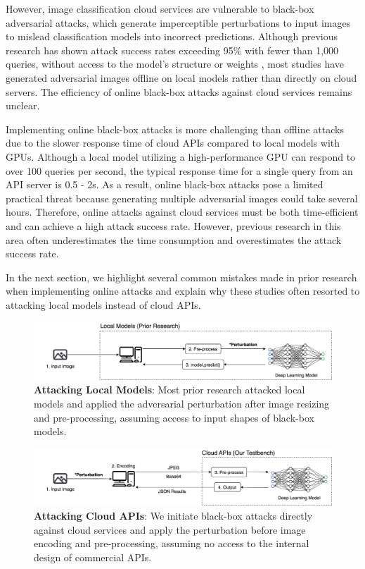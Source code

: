 However, image classification cloud services are vulnerable to black-box adversarial attacks, which generate imperceptible perturbations to input images to mislead classification models into incorrect predictions. Although previous research has shown attack success rates exceeding 95\% with fewer than 1,000 queries, without access to the model's structure or weights \citep{bhambri2019survey}, most studies have generated adversarial images offline on local models rather than directly on cloud servers. The efficiency of online black-box attacks against cloud services remains unclear.

Implementing online black-box attacks is more challenging than offline attacks due to the slower response time of cloud APIs compared to local models with GPUs. Although a local model utilizing a high-performance GPU can respond to over 100 queries per second, the typical response time for a single query from an API server is 0.5 - 2s. As a result, online black-box attacks pose a limited practical threat because generating multiple adversarial images could take several hours. Therefore, online attacks against cloud services must be both time-efficient and can achieve a high attack success rate. However, previous research in this area often underestimates the time consumption and overestimates the attack success rate.

In the next section, we highlight several common mistakes made in prior research when implementing online attacks and explain why these studies often resorted to attacking local models instead of cloud APIs.

\begin{figure}[H]
    \centering
    \includegraphics[width=\linewidth]{figures/chapter_classification/local.jpg}
    \caption{\textbf{Attacking Local Models}: Most prior research attacked local models and applied the adversarial perturbation after image resizing and pre-processing, assuming access to input shapes of black-box models.}
    \label{fig:local}
\end{figure}

\begin{figure}[H]
    \centering
    \includegraphics[width=\linewidth]{figures/chapter_classification/cloudapi.jpg}
    \caption{\textbf{Attacking Cloud APIs}: We initiate black-box attacks directly against cloud services and apply the perturbation before image encoding and pre-processing, assuming no access to the internal design of commercial APIs.}
    \label{fig:cloudapi}
\end{figure}

